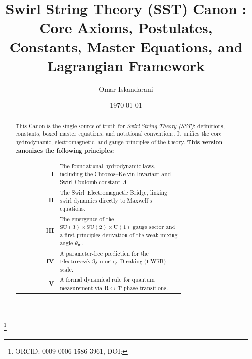 \documentclass[10pt,reprint,aps,onecolumn,nofootinbib]{revtex4-2}
\newcommand{\Lam}{\Lambda}                               %
\begin{document}
	\title{Swirl String Theory (SST) Canon \canonversion: \\ Core Axioms, Postulates, Constants, Master Equations, and Lagrangian Framework}
	\author{Omar Iskandarani}
    \thanks{ORCID: 0009-0006-1686-3961, DOI: \paperdoi}
	\date{\today}

    \begin{abstract}
    This Canon is the single source of truth for \emph{Swirl String Theory (SST)}: definitions, constants, boxed master equations, and notational conventions. It unifies the core hydrodynamic, electromagnetic, and gauge principles of the theory.
    \textbf{This version canonizes the following principles:}

    \begin{tabular}{r@{\quad}p{0.75\linewidth}}
        \textbf{I} & The foundational hydrodynamic laws, including the Chronos–Kelvin Invariant and Swirl Coulomb constant $\Lam$ \\
        \textbf{II} & The Swirl–Electromagnetic Bridge, linking swirl dynamics directly to Maxwell's equations.\\
        \textbf{III} & The emergence of the $\mathrm{SU}(3)\times\mathrm{SU}(2)\times\mathrm{U}(1)$ gauge sector and a first-principles derivation of the weak mixing angle $\theta_W$.\\
        \textbf{IV} & A parameter-free prediction for the Electroweak Symmetry Breaking (EWSB) scale. \\
        \textbf{V} & A formal dynamical rule for quantum measurement via R$\leftrightarrow$T phase transitions. \\
    \end{tabular}



\end{abstract}
\end{document}
